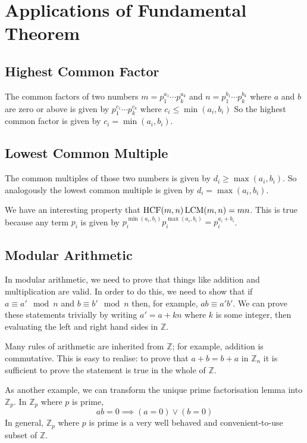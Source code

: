 \documentclass{article}
\begin{document}
\section{Applications of Fundamental Theorem}
\subsection{Highest Common Factor}
The common factors of two numbers $m = p_1^{a_1} \cdots p_k^{a_k}$ and $n = p_1^{b_1} \cdots p_k^{b_k}$ where $a$ and $b$ are zero or above is given by $p_1^{c_1} \cdots p_k^{c_k}$ where $c_i \leq \min(a_i, b_i)$ So the highest common factor is given by $c_i = \min(a_i, b_i)$.

\subsection{Lowest Common Multiple}
The common multiples of those two numbers is given by $d_i \geq \max(a_i, b_i)$. So analogously the lowest common multiple is given by $d_i = \max(a_i, b_i)$.

We have an interesting property that $\operatorname{HCF}(m, n) \operatorname{LCM}(m, n) = mn$. This is true because any term $p_i$ is given by $p_i^{\min(a_i, b_i)}p_i^{\max(a_i, b_i)} = p_i^{a_i + b_i}$.

\subsection{Modular Arithmetic}
In modular arithmetic, we need to prove that things like addition and multiplication are valid. In order to do this, we need to show that if $a \equiv a' \mod n$ and $b \equiv b' \mod n$ then, for example, $ab \equiv a'b'$. We can prove these statements trivially by writing $a' = a + kn$ where $k$ is some integer, then evaluating the left and right hand sides in $\mathbb Z$.

Many rules of arithmetic are inherited from $\mathbb Z$; for example, addition is commutative. This is easy to realise: to prove that $a + b = b + a$ in $\mathbb Z_n$ it is sufficient to prove the statement is true in the whole of $\mathbb Z$.

As another example, we can transform the unique prime factorisation lemma into $\mathbb Z_p$. In $\mathbb Z_p$ where $p$ is prime,
\[ ab = 0 \implies (a = 0) \lor (b = 0) \]
In general, $\mathbb Z_p$ where $p$ is prime is a very well behaved and convenient-to-use subset of $\mathbb Z$.
\end{document}
